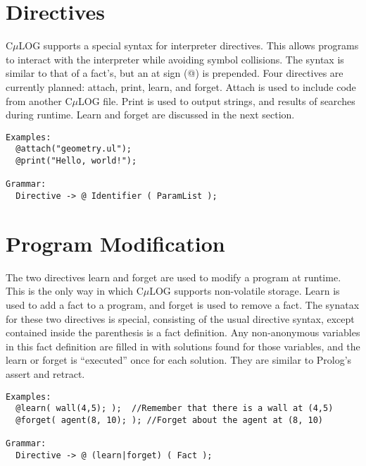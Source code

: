 \documentclass[onecolumn,titlepage]{article}
\begin{document}
\section{Directives}
C$\mu$LOG supports a special syntax for interpreter directives.  This allows programs to
interact with the interpreter while avoiding symbol collisions. The syntax is similar
to that of a fact's, but an at sign (@) is prepended. Four directives are currently planned:
attach, print, learn, and forget.  Attach is used to include code from another C$\mu$LOG file.
Print is used to output strings, and results of searches during runtime.  Learn and forget
are discussed in the next section.
\begin{verbatim}
Examples:
  @attach("geometry.ul");
  @print("Hello, world!");

Grammar:
  Directive -> @ Identifier ( ParamList ); 
\end{verbatim}

\section{Program Modification}
The two directives learn and forget are used to modify a program at runtime.  This
is the only way in which C$\mu$LOG supports non-volatile storage.  Learn is used to
add a fact to a program, and forget is used to remove a fact.  The synatax for these
two directives is special, consisting of the usual directive syntax, except contained
inside the parenthesis is a fact definition.  Any non-anonymous variables in this fact
definition are filled in with solutions found for those variables, and the learn or
forget is ``executed'' once for each solution.  They are similar to Prolog's assert and retract.
\begin{verbatim}
Examples:
  @learn( wall(4,5); );  //Remember that there is a wall at (4,5)
  @forget( agent(8, 10); ); //Forget about the agent at (8, 10)

Grammar:
  Directive -> @ (learn|forget) ( Fact ); 
\end{verbatim}
\end{document}

